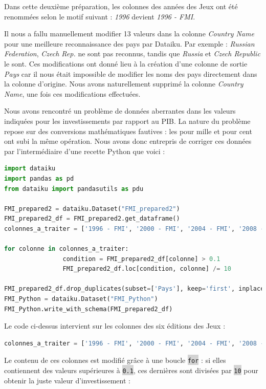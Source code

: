 \documentclass[hidelinks, 12pt]{report}
\newcommand{\code}[1]{\colorbox{LightGray}{\texttt{#1}}}
\begin{document}
Dans cette deuxième préparation, les colonnes des années des Jeux ont été renommées selon le motif suivant : \textit{1996} devient \textit{1996 - FMI}.

Il nous a fallu manuellement modifier 13 valeurs dans la colonne \emph{Country Name} pour une meilleure reconnaissance des pays par Dataiku. Par exemple : \emph{Russian Federation}, \emph{Czech Rep.} ne sont pas reconnus, tandis que \emph{Russia} et \emph{Czech Republic} le sont. Ces modifications ont donné lieu à la création d'une colonne de sortie \emph{Pays} car il nous était impossible de modifier les noms des pays directement dans la colonne d'origine. Nous avons naturellement supprimé la colonne \emph{Country Name}, une fois ces modifications effectuées. 

Nous avons rencontré un problème de données aberrantes dans les valeurs indiquées pour les investissements par rapport au PIB. La nature du problème repose sur des conversions mathématiques fautives : les pour mille et pour cent ont subi la même opération. Nous avons donc entrepris de corriger ces données par l'intermédiaire d'une recette Python que voici :

\begin{lstlisting}[language=python]
import dataiku
import pandas as pd
from dataiku import pandasutils as pdu

FMI_prepared2 = dataiku.Dataset("FMI_prepared2")
FMI_prepared2_df = FMI_prepared2.get_dataframe()
colonnes_a_traiter = ['1996 - FMI', '2000 - FMI', '2004 - FMI', '2008 - FMI', '2012 - FMI', '2016 - FMI']

for colonne in colonnes_a_traiter:
				condition = FMI_prepared2_df[colonne] > 0.1
				FMI_prepared2_df.loc[condition, colonne] /= 10

FMI_prepared2_df.drop_duplicates(subset=['Pays'], keep='first', inplace=True)
FMI_Python = dataiku.Dataset("FMI_Python")
FMI_Python.write_with_schema(FMI_prepared2_df)
\end{lstlisting}

Le code ci-dessus intervient sur les colonnes des six éditions des Jeux :

\begin{lstlisting}[language=python]	
colonnes_a_traiter = ['1996 - FMI', '2000 - FMI', '2004 - FMI', '2008 - FMI', '2012 - FMI', '2016 - FMI']
\end{lstlisting}

Le contenu de ces colonnes est modifié grâce à une boucle \code{for} : si elles contiennent des valeurs supérieures à \code{0.1}, ces dernières sont divisées par \code{10} pour obtenir la juste valeur d'investissement :
\end{document}
